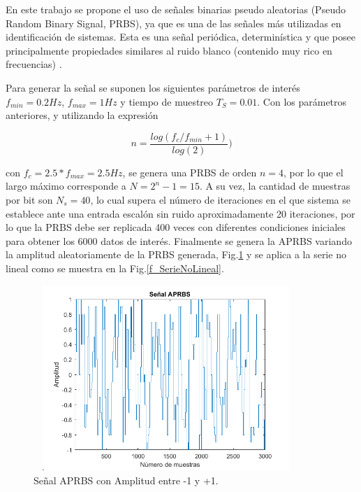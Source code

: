 \documentclass[12pt]{article}
\begin{document}
En este trabajo se propone el uso de señales binarias pseudo aleatorias (Pseudo Random Binary Signal, PRBS),  ya  que  es  una  de  las  señales  más  utilizadas  en  identificación  de sistemas. Esta es una señal periódica, determinística y que  posee  principalmente  propiedades  similares  al  ruido  blanco  (contenido  muy  rico  en frecuencias) \citep{nelles2013nonlinear}.

Para generar la señal se suponen los siguientes parámetros de interés $f_{min}=0.2 Hz$, $f_{max}=1 Hz$ y tiempo de muestreo $T_S=0.01$. Con los parámetros anteriores, y utilizando la expresión

\begin{equation}
n=\frac{log(f_c/f_{min}+1)}{log(2)})
\label{e_}
\end{equation}

con $f_c=2.5*f_{max}=2.5 Hz$, se genera una PRBS de orden $n= 4$, por lo que el largo máximo corresponde a $N = 2^n - 1 = 15$. A su vez, la cantidad de muestras por bit son $N_{s} = 40$,  lo cual supera el número de iteraciones en el que sistema se establece ante una entrada escalón sin ruido aproximadamente 20 iteraciones, por lo que la PRBS debe ser replicada 400 veces con diferentes condiciones iniciales para obtener los 6000 datos de interés. Finalmente se genera la APRBS variando la amplitud aleatoriamente de la PRBS generada, Fig.\ref{f_APRBS} y se aplica a la serie no lineal como se muestra en la Fig.\ref{f_SerieNoLineal}.

\begin{figure}
\centering
\includegraphics[width=10cm,height=7cm]{imag/APRBS}
\caption{Señal APRBS con Amplitud entre -1 y +1.}
\label{f_APRBS}
\end{figure}
\end{document}
